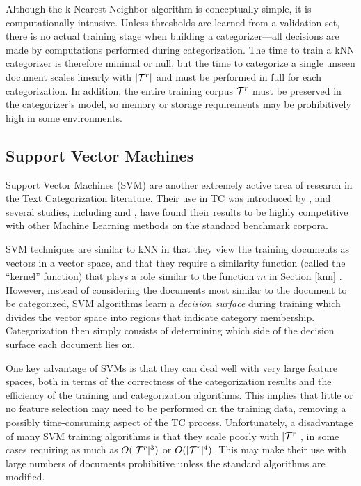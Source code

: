 Although the k-Nearest-Neighbor algorithm is conceptually simple, it
is computationally intensive.  Unless thresholds are learned from a
validation set, there is no actual training stage when building a
categorizer---all decisions are made by computations performed during
categorization.  The time to train a kNN categorizer is therefore
minimal or null, but the time to categorize a single unseen document
scales linearly with $|\mathcal{T}^r|$ and must be performed in full for each
categorization.  In addition, the entire training corpus $\mathcal{T}^r$ must
be preserved in the categorizer's model, so memory or storage
requirements may be prohibitively high in some environments.

\subsection{Support Vector Machines}

Support Vector Machines (SVM) are another extremely active area of
research in the Text Categorization literature.  Their use in TC was
introduced by \cite{joachims:98}, and several studies, including
\cite{joachims:98} and \cite{yang:99}, have found their results to be
highly competitive with other Machine Learning methods on the standard
benchmark corpora.

SVM techniques are similar to kNN in that they view the training
documents as vectors in a vector space, and that they require a
similarity function (called the ``kernel'' function) that plays a role
similar to the function $m$ in Section
\ref{knn} \cite[ch. 1]{scholkopf:02}. However, instead of considering
the documents most similar to the document to be categorized, SVM
algorithms learn a \emph{decision surface} during training which
divides the vector space into regions that indicate category
membership.  Categorization then simply consists of determining which
side of the decision surface each document lies on.

One key advantage of SVMs is that they can deal well with very large
feature spaces, both in terms of the correctness of the categorization
results and the efficiency of the training and categorization
algorithms.  This implies that little or no feature selection may need
to be performed on the training data, removing a possibly
time-consuming aspect of the TC process.  Unfortunately, a
disadvantage of many SVM training algorithms is that they scale poorly
with $|\mathcal{T}^r|$, in some cases requiring as much as $O(|\mathcal{T}^r|^3)$ or
$O(|\mathcal{T}^r|^4)$.  This may make their use with large numbers of
documents prohibitive unless the standard algorithms are modified.

